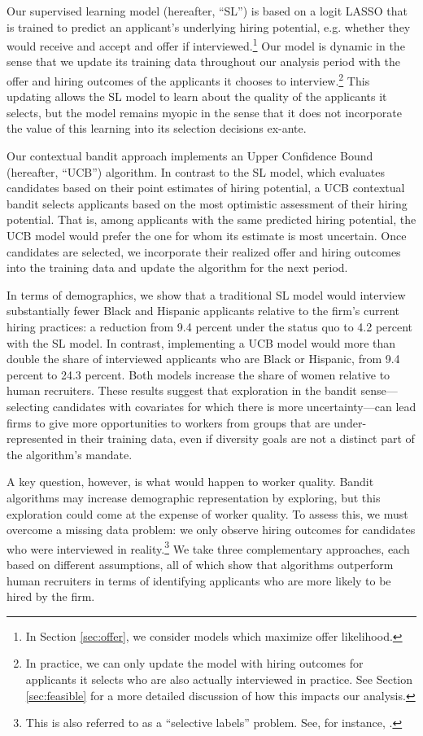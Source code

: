 \documentclass[crop,noquery,editorname,historyrev,nosurname,runningno,sepcount]{RESTUD}
\begin{document}
Our supervised learning model (hereafter, ``SL'') is based on a logit LASSO that is trained to predict an applicant's underlying hiring potential, e.g. whether they would receive and accept and offer if interviewed.\footnote{In Section \ref{sec:offer}, we consider models which maximize offer likelihood.}  Our model is dynamic in the sense that we update its training data throughout our analysis period with the offer and hiring outcomes of the applicants it chooses to interview.\footnote{In practice, we can only update the model with hiring outcomes for applicants it selects who are also actually interviewed in practice.  See Section \ref{sec:feasible} for a more detailed discussion of how this impacts our analysis.}  This updating allows the SL model to learn about the quality of the applicants it selects, but the model remains myopic in the sense that it does not incorporate the value of this learning into its selection decisions ex-ante. 

Our contextual bandit approach implements an Upper Confidence Bound (hereafter, ``UCB'') algorithm.  In contrast to the SL model, which evaluates candidates based on their point estimates of hiring potential, a UCB contextual bandit selects applicants based on the most optimistic assessment of their hiring potential.  That is, among applicants with the same predicted hiring potential, the UCB model would prefer the one for whom its estimate is most uncertain.  Once candidates are selected, we incorporate their realized offer and hiring outcomes into the training data and update the algorithm for the next period.


In terms of demographics, we show that a traditional SL model would interview substantially fewer Black and Hispanic applicants relative to the firm's current hiring practices: a reduction from 9.4 percent under the status quo to 4.2 percent with the SL model.  In contrast, implementing a UCB model would more than double the share of interviewed applicants who are Black or Hispanic, from 9.4 percent to 24.3 percent.  Both models increase the share of women relative to human recruiters.  These results suggest that exploration in the bandit sense---selecting candidates with covariates for which there is more uncertainty---can lead firms to give more opportunities to workers from groups that are under-represented in their training data, even if diversity goals are not a distinct part of the algorithm's mandate.

A key question, however, is what would happen to worker quality.  Bandit algorithms may increase demographic representation by exploring, but this exploration could come at the expense of worker quality.  To assess this, we must overcome a missing data problem: we only observe hiring outcomes for candidates who were interviewed in reality.\footnote{This is also referred to as a ``selective labels'' problem.  See, for instance, \citet{lakkaraju2017,mullainathan2018, adh_bias2020}.} We take three complementary approaches, each based on different assumptions, all of which show that algorithms outperform human recruiters in terms of identifying applicants who are more likely to be hired by the firm.  
\end{document}
